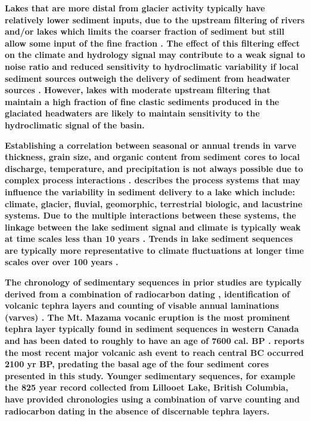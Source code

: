 \documentclass[Royal,times,doublespace,sageh]{sagej}
\begin{document}
\textbf{Lakes that are more distal from glacier activity typically have
relatively lower sediment inputs, due to the upstream filtering of
rivers and/or lakes which limits the coarser fraction of sediment but
still allow some input of the fine fraction \citep{Hodder2007c}. The
effect of this filtering effect on the climate and hydrology signal may
contribute to a weak signal to noise ratio and reduced sensitivity to
hydroclimatic variability if local sediment sources outweigh the
delivery of sediment from headwater sources \citep{Jerolmack2010}.
However, lakes with moderate upstream filtering that maintain a high
fraction of fine clastic sediments produced in the glaciated headwaters
are likely to maintain sensitivity to the hydroclimatic signal of the
basin.}

\textbf{Establishing a correlation between seasonal or annual trends in
varve thickness, grain size, and organic content from sediment cores to
local discharge, temperature, and precipitation is not always possible
due to complex process interactions
\citep{Hodder2007c, Menounos2008c, Heideman2017}. \citet{Hodder2007c}
describes the process systems that may influence the variability in
sediment delivery to a lake which include: climate, glacier, fluvial,
geomorphic, terrestrial biologic, and lacustrine systems. Due to the
multiple interactions between these systems, the linkage between the
lake sediment signal and climate is typically weak at time scales less
than 10 years \citep{Hodder2007c, Menounos2008c, Heideman2017}. Trends
in lake sediment sequences are typically more representative to climate
fluctuations at longer time scales over over 100 years
\citep{Leonard1999, Osborn2007, Heideman2017}.}

\textbf{The chronology of sedimentary sequences in prior studies are
typically derived from a combination of radiocarbon dating
\citep{Gilbert2012, Hodder2006b, Steinman2019}, identification of
volcanic tephra layers \citep{Gilbert2012, Hodder2006b, Steinman2019}
and counting of visable annual laminations (varves)
\citep{Hodder2006b, Heideman2015}. The Mt. Mazama vocanic eruption is
the most prominent tephra layer typically found in sediment sequences in
western Canada \citep{Gilbert2012, Steinman2019} and has been dated to
roughly to have an age of 7600 cal. BP
\citep{Zdanowicz1999, Hallett1997}. \citet{Westgate1977} reports the
most recent major volcanic ash event to reach central BC occurred 2100
yr BP, predating the basal age of the four sediment cores presented in
this study. Younger sedimentary sequences, for example the 825 year
record collected from Lillooet Lake, British Columbia, have provided
chronologies using a combination of varve counting and radiocarbon
dating in the absence of discernable tephra layers.}
\end{document}
